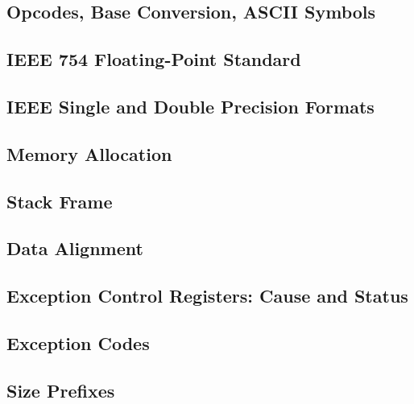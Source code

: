 \documentclass[10pt]{article}
\begin{document}
\subsection*{Opcodes, Base Conversion, ASCII Symbols}



\subsection*{IEEE 754 Floating-Point Standard}



\subsection*{IEEE Single and Double Precision Formats}



\subsection*{Memory Allocation}



\subsection*{Stack Frame}



\subsection*{Data Alignment}



\subsection*{Exception Control Registers: Cause and Status}



\subsection*{Exception Codes}



\subsection*{Size Prefixes}
\end{document}
